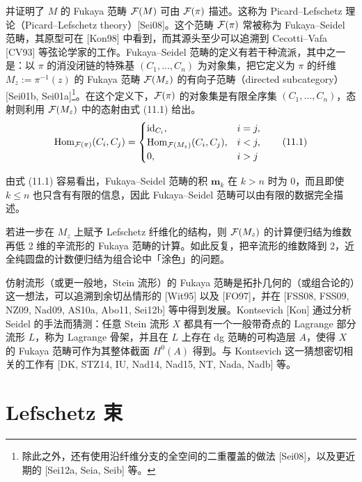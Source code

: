
并证明了 $M$ 的 Fukaya 范畴 $\mathcal{F}(M)$ 可由 $\mathcal{F}(\pi)$ 描述。这称为 Picard–Lefschetz 理论（Picard–Lefschetz theory）[Sei08]。这个范畴 $\mathcal{F}(\pi)$ 常被称为 Fukaya–Seidel 范畴，其原型可在 [Kon98] 中看到，而其源头至少可以追溯到 Cecotti–Vafa [CV93] 等弦论学家的工作。Fukaya–Seidel 范畴的定义有若干种流派，其中之一是：以 $\pi$ 的消没闭链的特殊基 $(C_1,\ldots,C_n)$ 为对象集，把它定义为 $\pi$ 的纤维 $M_z:=\pi^{-1}(z)$ 的 Fukaya 范畴 $\mathcal{F}(M_z)$ 的有向子范畴（directed subcategory）[Sei01b, Sei01a]\footnote{除此之外，还有使用沿纤维分支的全空间的二重覆盖的做法 [Sei08]，以及更近期的 [Sei12a, Seia, Seib] 等。}。在这个定义下，$\mathcal{F}(\pi)$ 的对象集是有限全序集 $(C_1,\ldots,C_n)$，态射则利用 $\mathcal{F}(M_z)$ 中的态射由式 (11.1) 给出。
\begin{equation}
  \operatorname{Hom}_{\mathcal{F}(\pi)}(C_i,C_j) =
  \begin{cases}
    \mathrm{id}_{C_i}, & i=j,\\
    \operatorname{Hom}_{\mathcal{F}(M_z)}(C_i,C_j), & i<j,\\
    0, & i>j
  \end{cases}
  \tag{11.1}
\end{equation}

由式 (11.1) 容易看出，Fukaya–Seidel 范畴的积 $\mathbf{m}_k$ 在 $k>n$ 时为 $0$，而且即使 $k\le n$ 也只含有有限的信息，因此 Fukaya–Seidel 范畴可以由有限的数据完全描述。

若进一步在 $M_z$ 上赋予 Lefschetz 纤维化的结构，则 $\mathcal{F}(M_z)$ 的计算便归结为维数再低 2 维的辛流形的 Fukaya 范畴的计算。如此反复，把辛流形的维数降到 2，近全纯圆盘的计数便归结为组合论中「涂色」的问题。

仿射流形（或更一般地，Stein 流形）的 Fukaya 范畴是拓扑几何的（或组合论的）这一想法，可以追溯到余切丛情形的 [Wit95] 以及 [FO97]，并在 [FSS08, FSS09, NZ09, Nad09, AS10a, Abo11, Sei12b] 等中得到发展。Kontsevich [Kon] 通过分析 Seidel 的手法而猜测：任意 Stein 流形 $X$ 都具有一个一般带奇点的 Lagrange 部分流形 $L$，称为 Lagrange 骨架，并且在 $L$ 上存在 dg 范畴的可构造层 $A$，使得 $X$ 的 Fukaya 范畴可作为其整体截面 $H^0(A)$ 得到。与 Kontsevich 这一猜想密切相关的工作有 [DK, STZ14, IU, Nad14, Nad15, NT, Nada, Nadb] 等。

\section{Lefschetz 束}

